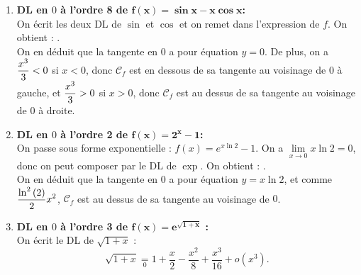 \documentclass[a4paper, 11pt,reqno]{article}
\begin{document}
\begin{correction}
\begin{enumerate}
		      Attention on ne peut pas composer directement car ce qu'on obtient ne tend pas vers $0$ ! On remplace dans l'exponentielle :
		      $$f(x) \underset{0}{=} \exp\left( 1- \frac{x}{2}+\frac{x^2}{3} + o(x^2)\right) \underset{0}{=} e \times \exp \left(- \frac{x}{2}+\frac{x^2}{3} + o(x^2)\right).$$
		      On peut cette fois composer par le DL de $\exp$. On obtient :
		      $$f(x)  \underset{0}{=}  e\left( 1- \frac{x}{2}+\frac{x^2}{3} + \frac{x^2}{8} + o(x^2)\right)$$
		      Soit : .\\
		      On en d\'eduit que la tangente en $0$ a pour \'equation $y=e-\ddp \frac{e}{2} x$, et comme $\ddp\frac{11}{24}x^2>0$, $\mathcal{C}_f$ est au dessus de sa tangente au voisinage de $0$.
		\item \textbf{DL en $0$  \`a l'ordre 8 de $\mathbf{f(x)=\sin{x}-x\cos{x}}$:}\\
		      On \'ecrit les deux DL de $\sin$ et $\cos$ et on remet dans l'expression de $f$. On obtient :
		      .\\
		      On en d\'eduit que la tangente en $0$ a pour \'equation $y=0$. De plus, on a  $\displaystyle \frac{x^3}{3} < 0$ si $x<0$, donc $\mathcal{C}_f$ est en dessous de sa tangente au voisinage de $0$ \`a gauche, et $\displaystyle \frac{x^3}{3}>0$ si $x>0$, donc $\mathcal{C}_f$ est au dessus de sa tangente au voisinage de $0$ \`a droite.
		\item \textbf{DL en $0$  \`a l'ordre 2 de $\mathbf{f(x)=2^x-1}$:} \\
		      On passe sous forme exponentielle : $f(x) = e^{x\ln2}-1$. On a $\lim\limits_{x\to 0} x\ln 2 =0$, donc on peut composer par le DL de $\exp$. On obtient :
		      .\\
		      On en d\'eduit que la tangente en $0$ a pour \'equation $y= x\ln{2}$, et comme $\displaystyle\frac{\ln^2{(2)}}{2}x^2 $, $\mathcal{C}_f$ est au dessus de sa tangente au voisinage de $0$.
		\item \textbf{DL en $0$ \`a l'ordre 3 de $\mathbf{f(x)=e^{\sqrt{1+x}}}$ :}\\
		      On \'ecrit le DL de $\sqrt{1+x}$ :
		      $$\sqrt{1+x} \underset{0}{=} 1 + \frac{x}{2}- \frac{x^2}{8} + \frac{x^3}{16}  + o(x^3).$$

\end{enumerate}
\end{correction}
\end{document}
